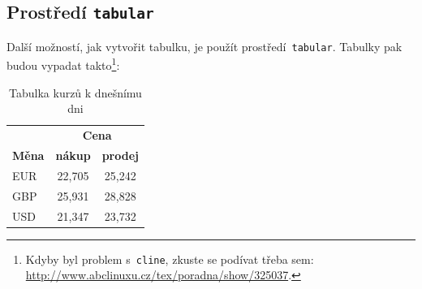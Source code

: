 \documentclass[11pt, a4paper]{article}
\begin{document}
\subsection{Prostředí \texttt{tabular}}
Další možností, jak vytvořit tabulku, je použít prostředí\verb| tabular|. Tabulky pak budou vypadat takto\footnote{Kdyby byl problem s\texttt{ cline}, zkuste se podívat třeba sem: \href{http://www.abclinuxu.cz/tex/poradna/show/325037}{http://www.abclinuxu.cz/tex/poradna/show/325037}.}:
\\
\begin{table}[h]
    \centering
    \begin{tabular}{|l|c|c|} \hline
         & \multicolumn{2}{|c|}{\textbf{Cena}}  \\ \cline{2-3}
         \textbf{Měna} & \textbf{nákup} & \textbf{prodej} \\ \hline
         EUR & 22,705 & 25,242 \\
         GBP & 25,931 & 28,828 \\
         USD & 21,347 & 23,732 \\ \hline
    \end{tabular}
    \caption{Tabulka kurzů k dnešnímu dni}
    \label{tab1}
\end{table}
\end{document}
